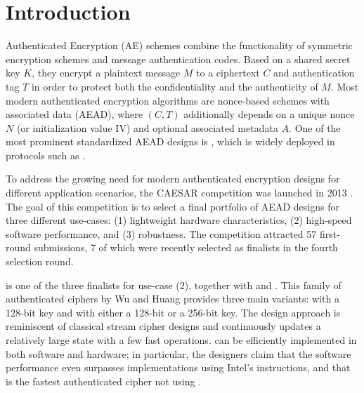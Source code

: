 \section{Introduction}
\label{sec/Introduction}

Authenticated Encryption (AE) schemes combine the functionality of symmetric encryption schemes and message authentication codes.
Based on a shared secret key $K$, they encrypt a plaintext message $M$ to a ciphertext $C$ and authentication tag $T$ in order to protect both the confidentiality and the authenticity of $M$.
Most modern authenticated encryption algorithms are nonce-based schemes with associated data (AEAD),
where $(C, T)$ additionally depends on a unique nonce $N$ (or initialization value IV) and optional associated metadata $A$.
One of the most prominent standardized AEAD designs is  \cite{indocryptMcGrewV04,nistDworkin07},
which is widely deployed in protocols such as .

To address the growing need for modern authenticated encryption designs for different application scenarios, 
the CAESAR competition was launched in 2013 \cite{CAESAR}.
The goal of this competition is to select a final portfolio of AEAD designs for three different use-cases:
(1) lightweight hardware characteristics,
(2) high-speed software performance, and
(3) robustness.
The competition attracted 57 first-round submissions, 7 of which were recently selected as finalists in the fourth selection round.

\morus is one of the three finalists for use-case (2), together with  and .
This family of authenticated ciphers by Wu and Huang \cite{MORUS} provides three main variants:
\morus[640] with a 128-bit key and \morus[1280] with either a 128-bit or a 256-bit key.
The design approach is reminiscent of classical stream cipher designs and
continuously updates a relatively large state with a few fast operations.
\morus can be efficiently implemented in both software and hardware;
in particular, the designers claim that the software performance even surpasses
 implementations using Intel's  instructions,
and that \morus is the fastest authenticated cipher not using  \cite{MORUS}.

